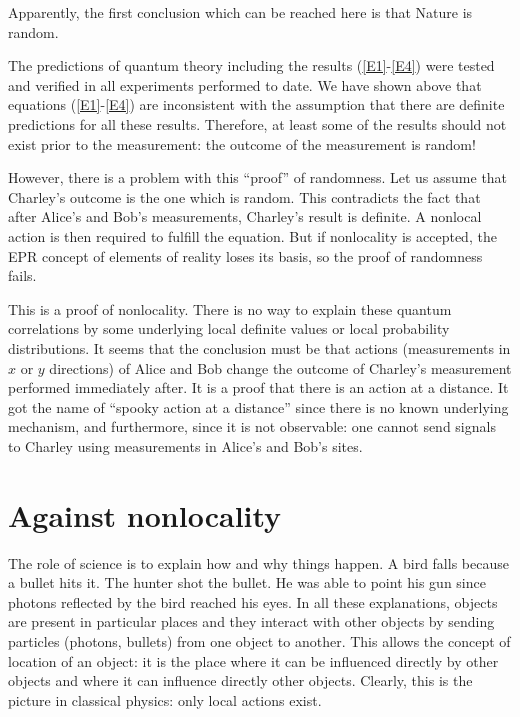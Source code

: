 \documentclass[12pt]{article}
\begin{document}
Apparently, the first  conclusion which can be reached here is that Nature is random.

The predictions of quantum theory including   the results (\ref{E1}-\ref{E4}) were tested and verified in all experiments performed to date. We have shown above that equations (\ref{E1}-\ref{E4}) are inconsistent with the assumption that there are definite predictions for all these results. Therefore, at least some of the results should not exist prior to the measurement: the outcome of the measurement is random!

However, there is a problem with this ``proof'' of randomness. Let us assume that Charley's outcome is the one which is random. This  contradicts the fact that after Alice's and Bob's measurements, Charley's result is definite. A nonlocal action is then required to  fulfill the equation. But if nonlocality is accepted, the EPR concept of elements of reality loses its basis, so the proof of randomness fails.

This is a proof of nonlocality. There is no way to explain these quantum correlations by some underlying local definite values or local probability distributions. It seems that the conclusion must be that actions (measurements in $x$ or $y$ directions) of Alice and Bob change the outcome of Charley's measurement performed immediately after. It is a proof that there is an action at a distance. It got the name of ``spooky action at a distance'' since there is no known underlying mechanism, and furthermore,  since it is not observable: one cannot send signals to Charley using measurements in Alice's and Bob's sites.

\section{Against nonlocality }

The role of science is to explain    how  and why things happen. A bird falls because a bullet hits it. The hunter shot the bullet. He was able to point his gun since photons reflected by the bird reached his eyes. In all these explanations, objects are present in particular places and they  interact with other objects by sending particles (photons, bullets) from one object to another. This  allows the concept of location of an object: it is the place where it can be influenced directly by  other objects and where it can influence directly other objects. Clearly, this is the picture in classical physics: only local actions exist.
\end{document}
